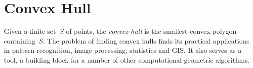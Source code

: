 
\chapter{Convex Hull}
\label{cha:convex-hull}

Given a finite set~$S$ of points, the {\em convex hull} is the
smallest convex polygon containing~$S$.
%
The problem of finding convex hulls finds its practical applications
in pattern recognition, image processing, statistics and GIS. It also
serves as a tool, a building block for a number of other
computational-geometric algorithms.
%

